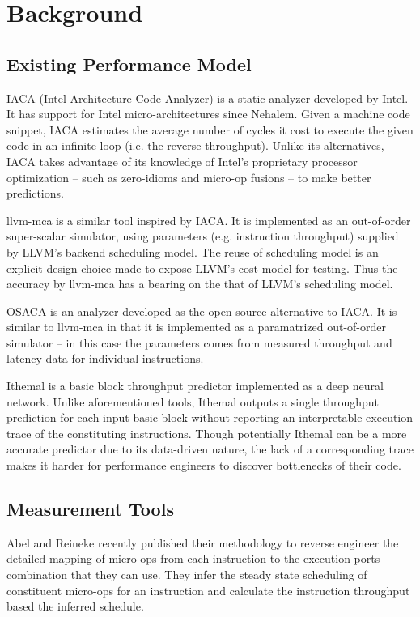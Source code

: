 \section{Background}

\subsection{Existing Performance Model}
IACA (Intel Architecture Code Analyzer) is a static analyzer
developed by Intel. It has support for Intel micro-architectures
since Nehalem.
Given a machine code snippet, IACA estimates the average number
of cycles it cost to execute the given code in an infinite 
loop (i.e. the reverse throughput).
Unlike its alternatives, IACA takes advantage of its knowledge
of Intel's proprietary processor optimization
-- such as zero-idioms and micro-op fusions -- to make better 
predictions.

llvm-mca is a similar tool inspired by IACA. 
It is implemented as an out-of-order super-scalar simulator,
using parameters (e.g. instruction throughput)
supplied by LLVM\cite{llvm}'s backend scheduling model.
The reuse of scheduling model is an explicit design choice
made to expose LLVM's cost model for testing.
Thus the accuracy by llvm-mca has a bearing on the 
that of LLVM's scheduling model.

OSACA\cite{osaca} is an analyzer developed as the open-source
alternative to IACA. It is similar to llvm-mca in that
it is implemented as a paramatrized out-of-order simulator
-- in this case the parameters comes from measured throughput
and latency data for individual instructions.

Ithemal\cite{ithemal} is a basic block throughput predictor
implemented as a deep neural network. Unlike aforementioned 
tools, Ithemal outputs a single throughput prediction for each
input basic block without reporting an interpretable execution
trace of the constituting instructions.
Though potentially Ithemal can be a more accurate predictor
due to its data-driven nature, the lack of a corresponding 
trace makes it harder for performance engineers to discover
bottlenecks of their code.

\subsection{Measurement Tools}
Abel and Reineke\cite{uops} recently published their methodology
to reverse engineer the detailed mapping of micro-ops
from each instruction to the execution ports combination
that they can use. They infer the steady state scheduling of constituent
micro-ops for an instruction and calculate the instruction throughput based
the inferred schedule.

